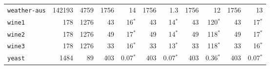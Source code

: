 \begin{tabular}{lccrrrrrrrr}
\texttt{weather-aus} & \multicolumn{1}{r}{142193} & \multicolumn{1}{r}{4759}  & 1756 & 14 & 1756 & 1.3 & 1756 & 12 & 1756 & 13\\
\texttt{wine1} & \multicolumn{1}{r}{178} & \multicolumn{1}{r}{1276}  & 43 & 16$^*$ & 43 & 14$^*$ & 43 & 120$^*$ & 43 & 17$^*$\\
\texttt{wine2} & \multicolumn{1}{r}{178} & \multicolumn{1}{r}{1276}  & 49 & 17$^*$ & 49 & 14$^*$ & 49 & 118$^*$ & 49 & 17$^*$\\
\texttt{wine3} & \multicolumn{1}{r}{178} & \multicolumn{1}{r}{1276}  & 33 & 16$^*$ & 33 & 13$^*$ & 33 & 118$^*$ & 33 & 16$^*$\\
\texttt{yeast} & \multicolumn{1}{r}{1484} & \multicolumn{1}{r}{89}  & 403 & 0.07$^*$ & 403 & 0.07$^*$ & 403 & 0.36$^*$ & 403 & 0.07$^*$\\
\bottomrule
\end{tabular}
